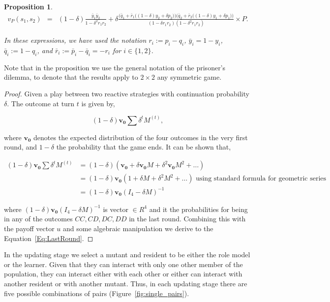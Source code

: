 \documentclass[11pt]{article}
\theoremstyle{plainCl1}
\newtheorem{Prop}{Proposition}
\theoremstyle{plainCl2}
\begin{document}
\begin{Prop}
\begin{equation}
\begin{array}{rcl}
      v_{P}(s_1,s_2) &= &\displaystyle (1\!-\!\delta)\frac{\bar{y}_1\bar{y}_2}{1\!-\!\delta^2 r_1 r_2}+\delta \frac{\Big(\bar{q}_1+\bar{r}_1\big((1\!-\!\delta)y_2+\delta p_2\big)\Big) \Big(\bar{q}_2+\bar{r}_2\big((1\!-\!\delta)y_1+\delta p_1\big)\Big)}
      {\displaystyle(1\!-\!\delta r_1r_2)(1\!-\!\delta^2 r_1 r_2)} \times P.
      \end{array}
    \end{equation}

In these expressions, we have used the notation $r_i:=p_i\!-\!q_i$,
$\bar{y}_i\!=\!1\!-\!y_i$, $\bar{q}_i:=1\!-\!q_i$, and
$\bar{r}_i:=\bar{p}_i\!-\!\bar{q}_i=-r_i$ for $i\!\in\!\{1,2\}$.
\end{Prop}

Note that in the proposition we use the general notation of the prisoner's
dilemma, to denote that the results apply to \(2 \times 2\) any symmetric game.

\begin{proof}
Given a play between two reactive strategies with continuation probability
$\delta$. The outcome at turn \(t\) is given by,

\begin{equation}\label{eq:}
  (1 - \delta) \mathbf{v_0} \sum \delta^{t} M^{(t)},
\end{equation}

where $\mathbf{v_0}$ denotes the expected distribution of the four outcomes in
the very first round, and \(1- \delta\) the probability that the game ends. It
can be shown that,

\begin{align*}
  (1 - \delta) \mathbf{v_0} \sum \delta^{t} M^{(t)} & = (1 - \delta)(\mathbf{v_0} + \delta \mathbf{v_0} M + \delta^{2}\mathbf{v_0} M ^{2} + \dots )\\ 
   & = (1 - \delta)\mathbf{v_0} (1 + \delta M + \delta^{2}M ^{2} + \dots ) \text{ using standard formula for geometric series}\\ 
   & = (1 - \delta)\mathbf{v_0}(I_4 - \delta M)^{-1}
\end{align*}

where \((1 - \delta)\mathbf{v_0}(I_4 - \delta M)^{-1}\) is vector \(\in R^{4}\)
and it the probabilities for being in any of the outcomes \(CC, CD, DC, DD\) in
the last round. Combining this with the payoff vector \(u\) and some algebraic
manipulation we derive to the Equation~\ref{Eq:LastRound}.
\end{proof}

In the updating stage we select a mutant and resident to be either the role
model or the learner. Given that they can interact with only one other member of
the population, they can interact either with each other or either can interact
with another resident or with another mutant. Thus, in each updating stage there
are five possible combinations of pairs (Figure~\ref{fig:single_pairs}).
\end{document}
